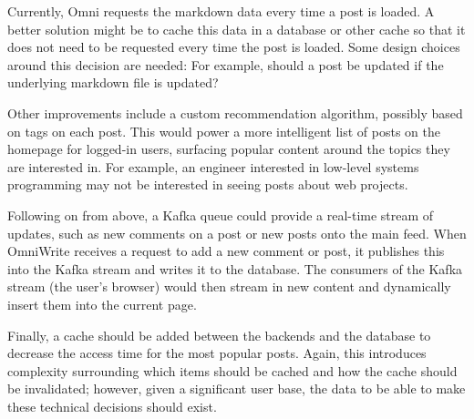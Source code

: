 Currently, Omni requests the markdown data every time a post is loaded.
A better solution might be to cache this data in a database or other cache so that it does not need to be requested every time the post is loaded.
Some design choices around this decision are needed: For example, should a post be updated if the underlying markdown file is updated?

Other improvements include a custom recommendation algorithm, possibly based on tags on each post.
This would power a more intelligent list of posts on the homepage for logged-in users, surfacing popular content around the topics they are interested in.
For example, an engineer interested in low-level systems programming may not be interested in seeing posts about web projects. 

Following on from above, a Kafka queue could provide a real-time stream of updates, such as new comments on a post or new posts onto the main feed.
When OmniWrite receives a request to add a new comment or post, it publishes this into the Kafka stream and writes it to the database.
The consumers of the Kafka stream (the user's browser) would then stream in new content and dynamically insert them into the current page. 

Finally, a cache should be added between the backends and the database to decrease the access time for the most popular posts.
Again, this introduces complexity surrounding which items should be cached and how the cache should be invalidated; however, given a significant user base, the data to be able to make these technical decisions should exist.
